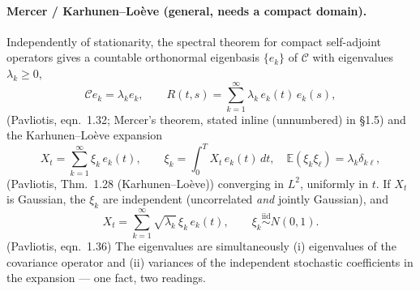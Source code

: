 \documentclass[11pt]{article}
\newcommand{\pav}[1]{{\small\color{hubblue}(Pavliotis, #1)}}
\begin{document}
\paragraph{Mercer / Karhunen--Lo\`eve (general, needs a compact domain).}
Independently of stationarity, the spectral theorem for compact self-adjoint operators gives a
countable orthonormal eigenbasis $\{e_k\}$ of $\mathcal{C}$ with eigenvalues $\lambda_k \geq 0$,
\begin{equation}
\mathcal{C}e_k = \lambda_k e_k, \qquad R(t,s) = \sum_{k=1}^{\infty}\lambda_k\,e_k(t)\,e_k(s),
\label{eq:kl-eigen}
\end{equation}
\pav{eqn.~1.32; Mercer's theorem, stated inline (unnumbered) in \S1.5} and the Karhunen--Lo\`eve
expansion
\begin{equation}
X_t = \sum_{k=1}^{\infty} \xi_k\, e_k(t), \qquad \xi_k = \int_0^T X_t\, e_k(t)\,dt,\quad
\mathbb{E}(\xi_k\xi_\ell) = \lambda_k\delta_{k\ell},
\label{eq:kl}
\end{equation}
\pav{Thm.~1.28 (Karhunen--Lo\`eve)} converging in $L^2$, uniformly in $t$. If $X_t$ is Gaussian, the
$\xi_k$ are independent (uncorrelated \emph{and} jointly Gaussian), and
\begin{equation}
X_t = \sum_{k=1}^{\infty} \sqrt{\lambda_k}\,\xi_k\, e_k(t), \qquad \xi_k \overset{\text{iid}}{\sim} N(0,1).
\label{eq:kl-gaussian}
\end{equation}
\pav{eqn.~1.36} The eigenvalues are simultaneously (i) eigenvalues of the covariance operator and
(ii) variances of the independent stochastic coefficients in the expansion --- one fact, two
readings.
\end{document}
